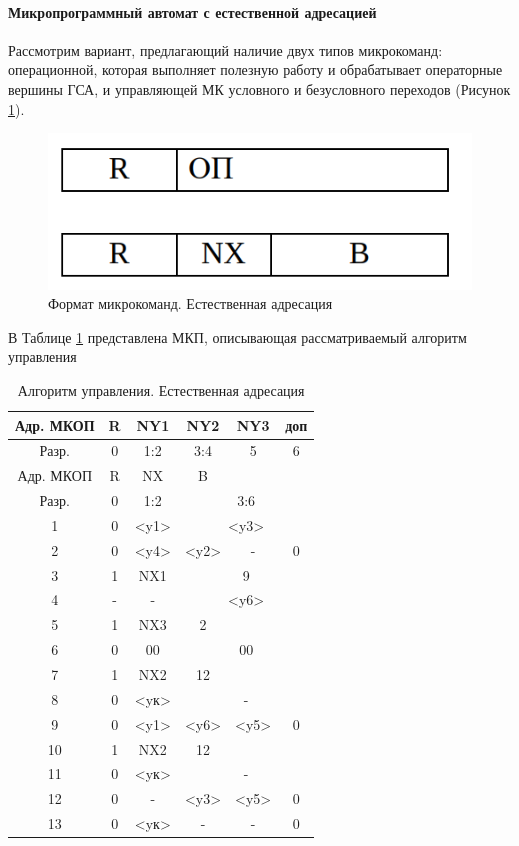 \newpage
\paragraph{Микропрограммный автомат с естественной адресацией}
Рассмотрим вариант, предлагающий наличие двух типов микрокоманд: операционной, которая выполняет полезную работу и обрабатывает операторные
вершины ГСА, и управляющей МК условного и безусловного переходов (Рисунок \ref{fig:mk-mix-nat}).

\begin{figure}[h!]
	\centering
	\includegraphics[width=0.4\linewidth]{images/mk-mix-nat}
	\caption{Формат микрокоманд. Естественная адресация}
	\label{fig:mk-mix-nat}
\end{figure}


В Таблице \ref{tab:manage-algorithm2} представлена МКП, описывающая рассматриваемый алгоритм управления

\begin{table}[htbp]
	\centering
	\begin{tabular}{|c|c|c|c|c|c|}
		\hline
		Адр. МКОП & R & NY1 & NY2 & NY3 & доп \\ \hline
		Разр. & 0 & 1:2 & 3:4 & 5 & 6 \\ \hline
		Адр. МКОП & R & NX & B &  &  \\ \hline
		Разр. & 0 & 1:2 & \multicolumn{ 3}{c|}{3:6} \\ \hline\hline
		1 & 0 & <y1> & \multicolumn{ 3}{c|}{<y3>} \\ \hline
		2 & 0 & <y4> & <y2> & - & 0 \\ \hline
		3 & 1 & NX1 & \multicolumn{ 3}{c|}{9}  \\ \hline
		4 & - & - & \multicolumn{ 3}{c|}{<y6>} \\ \hline
		5 & 1 & NX3 & 2 &  &  \\ \hline
		6 & 0 & 00 & \multicolumn{ 3}{c|}{00} \\ \hline
		7 & 1 & NX2 & 12 &  &  \\ \hline
		8 & 0 & <yк> & \multicolumn{ 3}{c|}{-} \\ \hline
		9 & 0 & <y1> & <y6> & <y5> & 0 \\ \hline
		10 & 1 & NX2 & 12 &  &  \\ \hline
		11 & 0 & <yк> & \multicolumn{ 3}{c|}{-} \\ \hline
		12 & 0 & - & <y3> & <y5> & 0 \\ \hline
		13 & 0 & <yк> & - & - & 0 \\ \hline
	\end{tabular}
	\caption{Алгоритм управления. Естественная адресация }
	\label{tab:manage-algorithm2}
\end{table}





